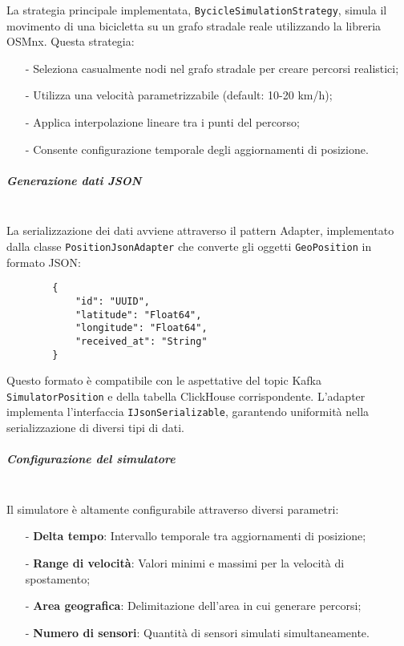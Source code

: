 \documentclass[10pt]{article}
\newcommand{\mysubparagraph}[1]{\subparagraph{#1}\mbox{}\\}
\begin{document}
        La strategia principale implementata, \texttt{BycicleSimulationStrategy}, simula il movimento di una bicicletta su un grafo stradale reale utilizzando la libreria OSMnx. Questa strategia:
        \begin{itemize}
            \item[-] Seleziona casualmente nodi nel grafo stradale per creare percorsi realistici;
            \item[-] Utilizza una velocità parametrizzabile (default: 10-20 km/h);
            \item[-] Applica interpolazione lineare tra i punti del percorso;
            \item[-] Consente configurazione temporale degli aggiornamenti di posizione.
        \end{itemize}
    
        \mysubparagraph{Generazione dati JSON}
        La serializzazione dei dati avviene attraverso il pattern Adapter, implementato dalla classe \texttt{PositionJsonAdapter} che converte gli oggetti \texttt{GeoPosition} in formato JSON:
        \begin{lstlisting}
        {
            "id": "UUID",
            "latitude": "Float64",
            "longitude": "Float64",
            "received_at": "String"
        }
        \end{lstlisting}
    
        Questo formato è compatibile con le aspettative del topic Kafka \texttt{SimulatorPosition} e della tabella ClickHouse corrispondente. L'adapter implementa l'interfaccia \texttt{IJsonSerializable}, garantendo uniformità nella serializzazione di diversi tipi di dati.
    
        \mysubparagraph{Configurazione del simulatore}
        Il simulatore è altamente configurabile attraverso diversi parametri:
        \begin{itemize}
            \item[-] \textbf{Delta tempo}: Intervallo temporale tra aggiornamenti di posizione;
            \item[-] \textbf{Range di velocità}: Valori minimi e massimi per la velocità di spostamento;
            \item[-] \textbf{Area geografica}: Delimitazione dell'area in cui generare percorsi;
            \item[-] \textbf{Numero di sensori}: Quantità di sensori simulati simultaneamente.
        \end{itemize}
    
\end{document}
